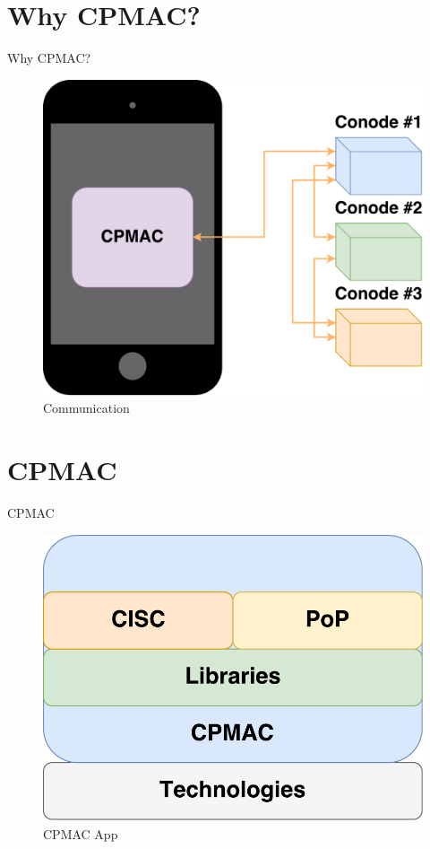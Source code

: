 \documentclass{beamer}
\begin{document}
\section{Why CPMAC?}
\begin{frame}{Why CPMAC?}

\begin{figure}[h]
\includegraphics[scale=.45]{graphic/communication.pdf}
\centering
\caption*{Communication}
\end{figure}

\end{frame}

\section{CPMAC}
\begin{frame}{CPMAC}

\begin{figure}[h]
\includegraphics[scale=.6]{graphic/cpmac.pdf}
\centering
\caption*{CPMAC App}
\end{figure}

\end{frame}
\end{document}
